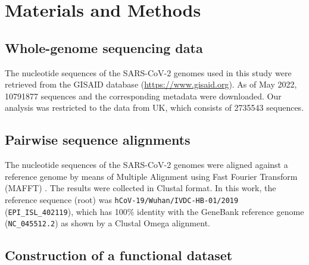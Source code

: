 \section{Materials and Methods}

\subsection{Whole-genome sequencing data}

The nucleotide sequences of the SARS-CoV-2 genomes used in this study were retrieved from the GISAID database (\url{https://www.gisaid.org}). As of May 2022, 10791877 sequences and the corresponding metadata were downloaded. Our analysis was restricted to the data from UK, which consists of 2735543 sequences. 

\subsection{Pairwise sequence alignments}

The nucleotide sequences of the SARS-CoV-2 genomes were aligned against a reference genome by means of Multiple Alignment using Fast Fourier Transform (MAFFT) \cite{katoh2002}. The results were collected in Clustal format. In this work, the reference sequence (root) was \texttt{hCoV-19/Wuhan/IVDC-HB-01/2019} (\texttt{EPI\_ISL\_402119}), which has 100\% identity with the GeneBank reference genome (\texttt{NC\_045512.2}) as shown by a Clustal Omega \cite{sievers2011} alignment.

\subsection{Construction of a functional dataset}

